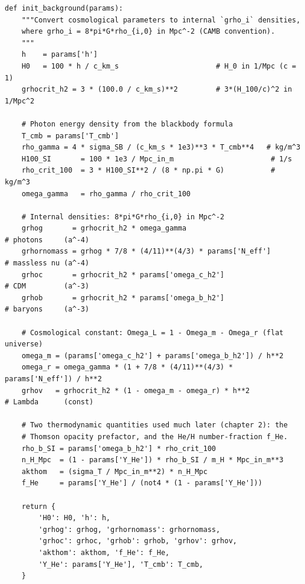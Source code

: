 \begin{codebox}
\begin{lstlisting}[style=python]
def init_background(params):
    """Convert cosmological parameters to internal `grho_i` densities,
    where grho_i = 8*pi*G*rho_{i,0} in Mpc^-2 (CAMB convention).
    """
    h    = params['h']
    H0   = 100 * h / c_km_s                       # H_0 in 1/Mpc (c = 1)
    grhocrit_h2 = 3 * (100.0 / c_km_s)**2         # 3*(H_100/c)^2 in 1/Mpc^2

    # Photon energy density from the blackbody formula
    T_cmb = params['T_cmb']
    rho_gamma = 4 * sigma_SB / (c_km_s * 1e3)**3 * T_cmb**4   # kg/m^3
    H100_SI       = 100 * 1e3 / Mpc_in_m                       # 1/s
    rho_crit_100  = 3 * H100_SI**2 / (8 * np.pi * G)           # kg/m^3
    omega_gamma   = rho_gamma / rho_crit_100

    # Internal densities: 8*pi*G*rho_{i,0} in Mpc^-2
    grhog       = grhocrit_h2 * omega_gamma                              # photons     (a^-4)
    grhornomass = grhog * 7/8 * (4/11)**(4/3) * params['N_eff']          # massless nu (a^-4)
    grhoc       = grhocrit_h2 * params['omega_c_h2']                     # CDM         (a^-3)
    grhob       = grhocrit_h2 * params['omega_b_h2']                     # baryons     (a^-3)

    # Cosmological constant: Omega_L = 1 - Omega_m - Omega_r (flat universe)
    omega_m = (params['omega_c_h2'] + params['omega_b_h2']) / h**2
    omega_r = omega_gamma * (1 + 7/8 * (4/11)**(4/3) * params['N_eff']) / h**2
    grhov   = grhocrit_h2 * (1 - omega_m - omega_r) * h**2               # Lambda      (const)

    # Two thermodynamic quantities used much later (chapter 2): the
    # Thomson opacity prefactor, and the He/H number-fraction f_He.
    rho_b_SI = params['omega_b_h2'] * rho_crit_100
    n_H_Mpc  = (1 - params['Y_He']) * rho_b_SI / m_H * Mpc_in_m**3
    akthom   = (sigma_T / Mpc_in_m**2) * n_H_Mpc
    f_He     = params['Y_He'] / (not4 * (1 - params['Y_He']))

    return {
        'H0': H0, 'h': h,
        'grhog': grhog, 'grhornomass': grhornomass,
        'grhoc': grhoc, 'grhob': grhob, 'grhov': grhov,
        'akthom': akthom, 'f_He': f_He,
        'Y_He': params['Y_He'], 'T_cmb': T_cmb,
    }
\end{lstlisting}
\end{codebox}

